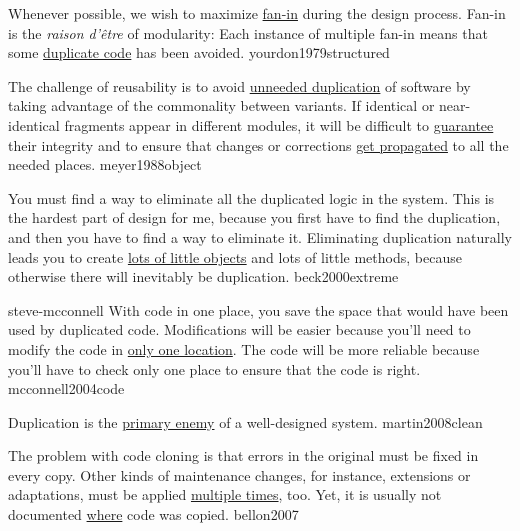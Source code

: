 \documentclass{article}
\begin{document}


  {Whenever possible, we wish to maximize \ul{fan-in} during the design process. Fan-in is the \textit{raison d'\^{e}tre} of modularity: Each instance of multiple fan-in means that some \ul{duplicate code} has been avoided.}
  {yourdon1979structured}

  {The challenge of reusability is to avoid \ul{unneeded duplication} of software by taking advantage of the commonality between variants. If identical or near-identical fragments appear in different modules, it will be difficult to \ul{guarantee} their integrity and to ensure that changes or corrections \ul{get propagated} to all the needed places.}
  {meyer1988object}

  {You must find a way to eliminate all the duplicated logic in the system. This is the hardest part of design for me, because you first have to find the duplication, and then you have to find a way to eliminate it. Eliminating duplication naturally leads you to create \ul{lots of little objects} and lots of little methods, because otherwise there will inevitably be duplication.}
  {beck2000extreme}

\lnQuote
  {steve-mcconnell}
  {With code in one place, you save the space that would have been used by duplicated code. Modifications will be easier because you'll need to modify the code in \ul{only one location}. The code will be more reliable because you'll have to check only one place to ensure that the code is right.}
  {mcconnell2004code}

  {Duplication is the \ul{primary enemy} of a well-designed system.}
  {martin2008clean}


  {The problem with code cloning is that errors in the original must be fixed in every copy. Other kinds of maintenance changes, for instance, extensions or adaptations, must be applied \ul{multiple times}, too. Yet, it is usually not documented \ul{where} code was copied.}
  {bellon2007}
\end{document}
